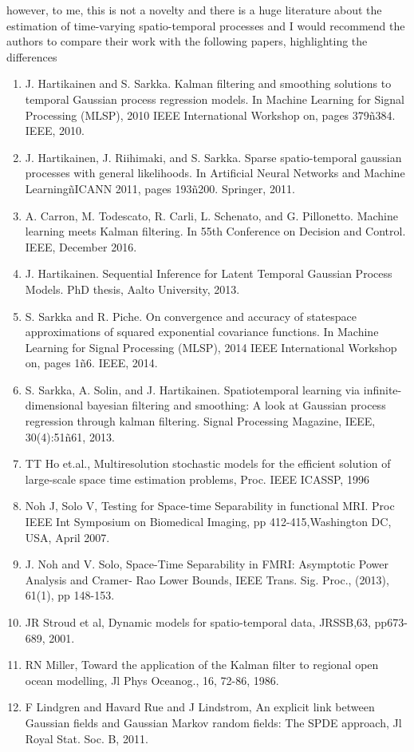 \documentclass{letter}
\begin{document}
however, to me, this is not a novelty and there is a huge literature
about the estimation of time-varying spatio-temporal processes and I
would recommend the authors to compare their work with the following
papers, highlighting the differences
\begin{enumerate}
\item J. Hartikainen and S. Sarkka. Kalman filtering and smoothing
solutions to temporal Gaussian process regression models. In Machine
Learning for Signal Processing (MLSP), 2010 IEEE International
Workshop on, pages 379ñ384. IEEE, 2010.
\item J. Hartikainen, J. Riihimaki, and S. Sarkka. Sparse spatio-temporal
gaussian processes with general likelihoods. In Artificial Neural
Networks and Machine LearningñICANN 2011, pages 193ñ200.
Springer, 2011.
\item A. Carron, M. Todescato, R. Carli, L. Schenato, and G. Pillonetto.
Machine learning meets Kalman filtering. In 55th Conference on
Decision and Control. IEEE, December 2016.
\item J. Hartikainen. Sequential Inference for Latent Temporal Gaussian
Process Models. PhD thesis, Aalto University, 2013.
\item S. Sarkka and R. Piche. On convergence and accuracy of statespace
approximations of squared exponential covariance functions.
In Machine Learning for Signal Processing (MLSP), 2014 IEEE
International Workshop on, pages 1ñ6. IEEE, 2014.
\item S. Sarkka, A. Solin, and J. Hartikainen. Spatiotemporal learning
via infinite-dimensional bayesian filtering and smoothing: A look
at Gaussian process regression through kalman filtering. Signal
Processing Magazine, IEEE, 30(4):51ñ61, 2013.
\item TT Ho et.al., Multiresolution stochastic models for
the efficient solution of large-scale space time estimation
problems, Proc. IEEE ICASSP, 1996
\item Noh J, Solo V, Testing for Space-time Separability in
functional MRI. Proc IEEE Int Symposium on Biomedical
Imaging, pp 412-415,Washington DC, USA, April
2007.
\item J. Noh and V. Solo, Space-Time Separability in FMRI:
Asymptotic Power Analysis and Cramer- Rao Lower
Bounds, IEEE Trans. Sig. Proc., (2013), 61(1), pp
148-153.
\item JR Stroud et al, Dynamic models for spatio-temporal
data, JRSSB,63, pp673-689, 2001.
\item RN Miller, Toward the application of the Kalman filter
to regional open ocean modelling, Jl Phys Oceanog.,
16, 72-86, 1986.
\item F Lindgren and Havard Rue and J Lindstrom, An explicit
link between Gaussian fields and Gaussian Markov
random fields: The SPDE approach, Jl Royal Stat.
Soc. B, 2011.
\end{enumerate}
\end{document}
